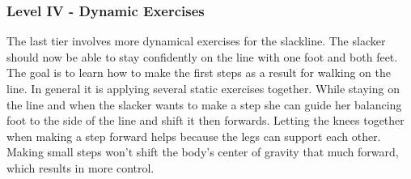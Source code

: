 \subsubsection{Level IV - Dynamic Exercises}
The last tier involves more dynamical exercises for the slackline. The slacker should now be able to stay confidently on the line with one foot and both feet. The goal is to learn how to make the first steps as a result for walking on the line. In general it is applying several static exercises together. While staying on the line and when the slacker wants to make a step she can guide her balancing foot to the side of the line and shift it then forwards. Letting the knees together when making a step forward helps because the legs can support each other. Making small steps won't shift the body's center of gravity that much forward, which results in more control.
